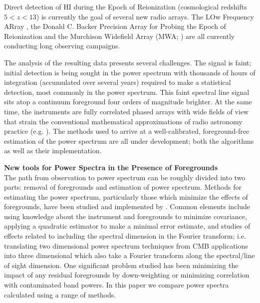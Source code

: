 \documentclass[twolcolumn,iop]{emulateapj}
\begin{document}
Direct detection of HI during the Epoch of Reionization (cosmological redshifts $5<z<13$) is currently the goal of several new radio arrays. The LOw Frequency ARray \citep[LOFAR;][]{Yatawatta:2013p9699}, the Donald C. Backer Precision Array for Probing the Epoch of Reionization \citep[PAPER][]{Parsons:2014p10499} and the Murchison Widefield Array (MWA; \cite{Tingay:2013p9022,Bowman:2013p9950}) are all currently conducting long observing campaigns.



The analysis of the resulting data presents several challenges. The signal is faint; initial detection is being sought in the power spectrum with thousands of hours of integration (accumulated over several years) required to make a statistical detection, most commonly in the power spectrum. This faint spectral line signal sits atop a continuum foreground four orders of magnitude brighter\cite{Santos:2006p6697,Bowman:2009p7816,Pober:2013p9942}. At the same time, the instruments are fully correlated phased arrays with wide fields of view that strain the conventional mathematical approximations of radio astronomy practice (e.g. \cite{2007TMS}). The methods used to arrive at a well-calibrated, foreground-free estimation of the power spectrum are all under development; both the algorithms as well as their implementation.  



{\bf New tools for Power Spectra in the Presence of Foregrounds}\\
The path from observation to power spectrum can be roughly divided into two parts: removal of foregrounds and estimation of power spectrum. 
Methods for estimating the power spectrum, particularly those which minimize the effects of foregrounds, have been studied and implemented by \citet{Morales:2006p1870,Jelic:2008p2130,Harker:2009MNRAS.397.1138H,Morales:2012p8790,Dillon:2013p10497,Chapman:7p8505,Chapman:2013p10379,Dillon:2014p9788,Liu:2011p8763,Trott:2012p10466,2014PhRvD..90b3018L,2014PhRvD..90b3019L}. Common elements include using knowledge about the instrument and foregrounds to minimize covariance, applying a  quadratic estimator to make a minimal error estimate, and studies of effects related to including the spectral dimension in the Fourier transform; i.e. translating two dimensional power spectrum techniques from CMB applications into three dimensional which also take a Fourier transform along the spectral/line of sight dimension.   One significant problem studied has been minimizing the impact of any residual foregrounds by down-weighting or minimizing correlation with contaminated band powers. In this paper we compare power spectra calculated using a range of methods. 
\end{document}
